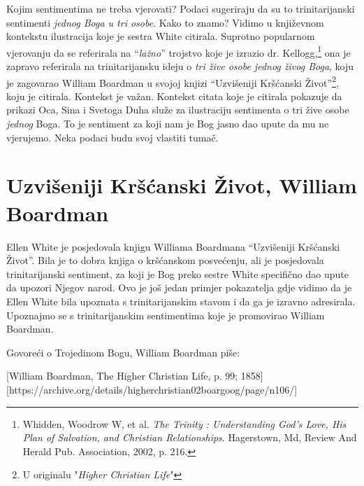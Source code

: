 Kojim sentimentima ne treba vjerovati? Podaci sugeriraju da su to trinitarijanski sentimenti \textit{jednog Boga u tri osobe}. Kako to znamo? Vidimo u književnom kontekstu ilustracija koje je sestra White citirala. Suprotno popularnom vjerovanju da se referirala na “\textit{lažno}” trojstvo koje je izrazio dr. Kellogg,\footnote{Whidden, Woodrow W, et al. \textit{The Trinity : Understanding God's Love, His Plan of Salvation, and Christian Relationships}. Hagerstown, Md, Review And Herald Pub. Association, 2002, p. 216.} ona je zapravo referirala na trinitarijansku ideju o \textit{tri žive osobe jednog živog Boga}, koju je zagovarao William Boardman u svojoj knjizi “Uzvišeniji Kršćanski Život”\footnote{U originalu "\textit{Higher Christian Life}"}, koju je citirala. Kontekst je važan. Kontekst citata koje je citirala pokazuje da prikazi Oca, Sina i Svetoga Duha služe za ilustraciju sentimenta o tri žive osobe \textit{jednog} Boga. To je sentiment za koji nam je Bog jasno dao upute da mu ne vjerujemo. Neka podaci budu svoj vlastiti tumač.

\section*{Uzvišeniji Kršćanski Život, William Boardman}

Ellen White je posjedovala knjigu Williama Boardmana “Uzvišeniji Kršćanski Život”. Bila je to dobra knjiga o kršćanskom posvećenju, ali je posjedovala trinitarijanski sentiment, za koji je Bog preko sestre White specifično dao upute da upozori Njegov narod. Ovo je još jedan primjer pokazatelja gdje vidimo da je Ellen White bila upoznata s trinitarijanskim stavom i da ga je izravno adresirala. Upoznajmo se s trinitarijanskim sentimentima koje je promovirao William Boardman.

Govoreći o Trojedinom Bogu, William Boardman piše:

[William Boardman, The Higher Christian Life, p. 99; 1858][https://archive.org/details/higherchristian02boargoog/page/n106/]

